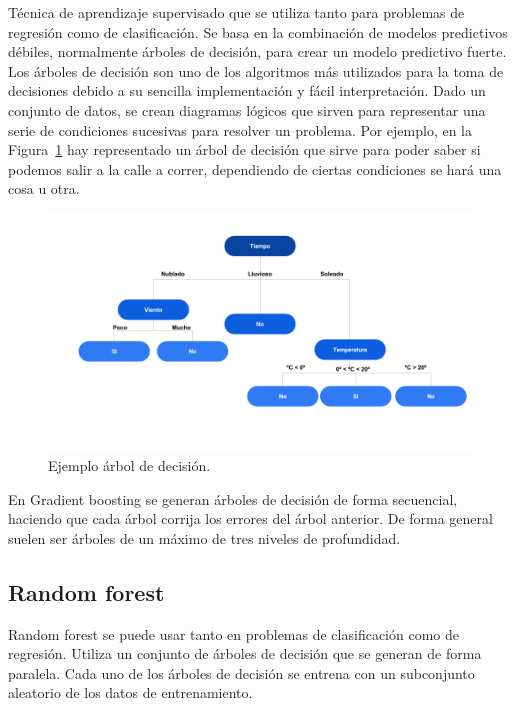 \documentclass[a4paper, 12pt]{book}
\begin{document}
Técnica de aprendizaje supervisado que se utiliza tanto para problemas de regresión como de clasificación. Se basa en la combinación de modelos predictivos débiles, normalmente árboles de decisión, para crear un modelo predictivo fuerte. Los árboles de decisión son uno de los algoritmos más utilizados para la toma de decisiones debido a su sencilla implementación y fácil interpretación. Dado un conjunto de datos, se crean diagramas lógicos que sirven para representar una serie de condiciones sucesivas para resolver un problema. Por ejemplo, en la Figura~\ref{fig:ejemplo_adecision} hay representado un árbol de decisión que sirve para poder saber si podemos salir a la calle a correr, dependiendo de ciertas condiciones se hará una cosa u otra. 

\begin{figure}[]
  \centering
  \includegraphics[width=16cm, keepaspectratio]{img/ejemplo_adecision.png}
  \caption{Ejemplo árbol de decisión.}\label{fig:ejemplo_adecision}
\end{figure}

En Gradient boosting se generan árboles de decisión de forma secuencial, haciendo que cada árbol corrija los errores del árbol anterior. De forma general suelen ser árboles de un máximo de tres niveles de profundidad.

\subsection{Random forest}
\label{subsec:random_forest}

Random forest se puede usar tanto en problemas de clasificación como de regresión. Utiliza un conjunto de árboles de decisión que se generan de forma paralela. Cada uno de los árboles de decisión se entrena con un subconjunto aleatorio de los datos de entrenamiento. 
\end{document}

